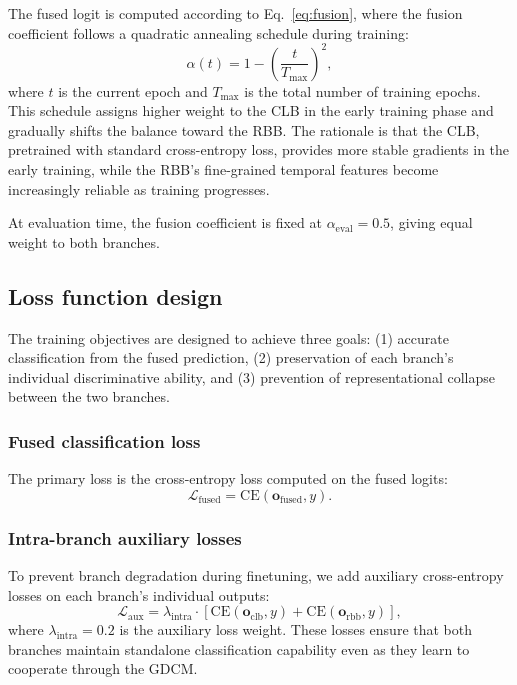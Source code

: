 The fused logit is computed according to Eq.~\eqref{eq:fusion}, where the fusion coefficient follows a quadratic annealing schedule during training:
\begin{equation}\label{eq:alpha_schedule}
    \alpha(t) = 1 - \left(\frac{t}{T_{\max}}\right)^2,
\end{equation}
where $t$ is the current epoch and $T_{\max}$ is the total number of training epochs. This schedule assigns higher weight to the CLB in the early training phase and gradually shifts the balance toward the RBB. The rationale is that the CLB, pretrained with standard cross-entropy loss, provides more stable gradients in the early training, while the RBB's fine-grained temporal features become increasingly reliable as training progresses.

At evaluation time, the fusion coefficient is fixed at $\alpha_{\text{eval}} = 0.5$, giving equal weight to both branches.


\subsection{Loss function design}\label{sec:loss}

The training objectives are designed to achieve three goals: (1) accurate classification from the fused prediction, (2) preservation of each branch's individual discriminative ability, and (3) prevention of representational collapse between the two branches.

\subsubsection{Fused classification loss}

The primary loss is the cross-entropy loss computed on the fused logits:
\begin{equation}
    \mathcal{L}_{\text{fused}} = \text{CE}(\mathbf{o}_{\text{fused}}, y).
\end{equation}

\subsubsection{Intra-branch auxiliary losses}

To prevent branch degradation during finetuning, we add auxiliary cross-entropy losses on each branch's individual outputs:
\begin{equation}
    \mathcal{L}_{\text{aux}} = \lambda_{\text{intra}} \cdot \left[\text{CE}(\mathbf{o}_{\text{clb}}, y) + \text{CE}(\mathbf{o}_{\text{rbb}}, y)\right],
\end{equation}
where $\lambda_{\text{intra}} = 0.2$ is the auxiliary loss weight. These losses ensure that both branches maintain standalone classification capability even as they learn to cooperate through the GDCM.

